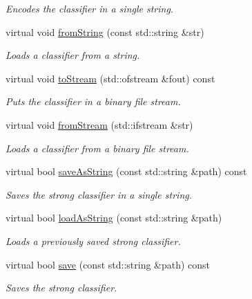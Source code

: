 \begin{DoxyCompactItemize}
\begin{DoxyCompactList}\small\item\em Encodes the classifier in a single string. \end{DoxyCompactList}\item 
virtual void \hyperlink{classiCub_1_1boostMIL_1_1StrongClassifier_abdfebbfe702c289e2841a26835e8d46f}{from\+String} (const std\+::string \&str)
\begin{DoxyCompactList}\small\item\em Loads a classifier from a string. \end{DoxyCompactList}\item 
virtual void \hyperlink{classiCub_1_1boostMIL_1_1StrongClassifier_a5f8724e7d8cffd11e4128087c4c18412}{to\+Stream} (std\+::ofstream \&fout) const 
\begin{DoxyCompactList}\small\item\em Puts the classifier in a binary file stream. \end{DoxyCompactList}\item 
virtual void \hyperlink{classiCub_1_1boostMIL_1_1StrongClassifier_a64bcbc003a3fcde2bd8f20cc98f4d71b}{from\+Stream} (std\+::ifstream \&str)
\begin{DoxyCompactList}\small\item\em Loads a classifier from a binary file stream. \end{DoxyCompactList}\item 
virtual bool \hyperlink{classiCub_1_1boostMIL_1_1StrongClassifier_ab92075af6f373b770f723e1289fca780}{save\+As\+String} (const std\+::string \&path) const 
\begin{DoxyCompactList}\small\item\em Saves the strong classifier in a single string. \end{DoxyCompactList}\item 
virtual bool \hyperlink{classiCub_1_1boostMIL_1_1StrongClassifier_aa3dafb8b823e28e200ce97ec81676667}{load\+As\+String} (const std\+::string \&path)
\begin{DoxyCompactList}\small\item\em Loads a previously saved strong classifier. \end{DoxyCompactList}\item 
virtual bool \hyperlink{classiCub_1_1boostMIL_1_1StrongClassifier_ac812325b217d16e1e3c469e5d4a9eb76}{save} (const std\+::string \&path) const 
\begin{DoxyCompactList}\small\item\em Saves the strong classifier. \end{DoxyCompactList}\item 

\end{DoxyCompactItemize}
